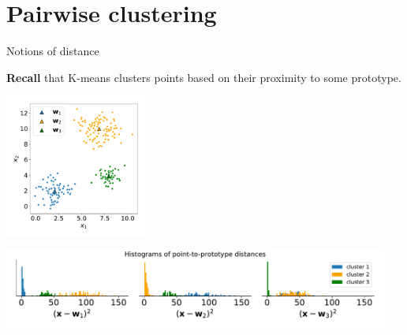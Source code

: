 \section{Pairwise clustering}



\begin{frame}{Notions of distance}

\textbf{Recall} that K-means clusters points based on their proximity to some prototype.\\

\svspace{-4mm}

\begin{center}
	\includegraphics[width=0.35\textwidth]{img/m3_data}
\end{center}
\begin{center}
	\includegraphics[width=0.95\textwidth]{img/m3_hist_point_proto} 
\end{center}

\end{frame}

